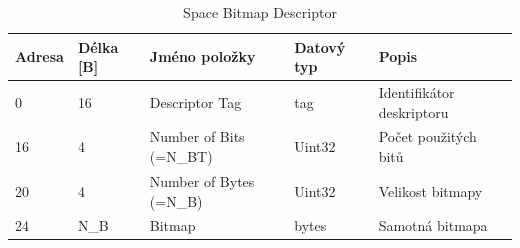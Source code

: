 \begin{table}[]
    \centering
    \begin{tabular}{ | l | l | p{4.2cm} | p{1.8cm} | p{5.5cm} | }
        \hline
        Adresa  & Délka [B]   & Jméno položky & Datový typ    & Popis \\ \hline\hline
        0   &16     & Descriptor Tag                    & tag           & Identifikátor deskriptoru \\ \hline
        16  &4      & Number of Bits (=N\_BT)           & Uint32        & Počet použitých bitů \\ \hline
        20  &4      & Number of Bytes (=N\_B)           & Uint32        & Velikost bitmapy \\ \hline
        24  &N\_B   & Bitmap                            & bytes         & Samotná bitmapa \\ \hline
    \end{tabular}
    \caption{Space Bitmap Descriptor\label{tab:sbd}}
\end{table}

